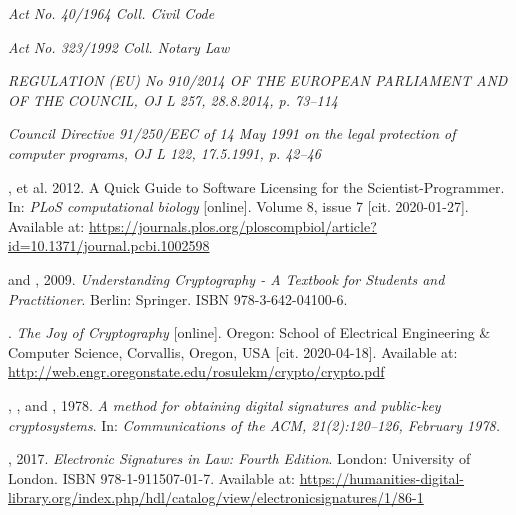 \documentclass[thesismargins, english, thesislinespacing, twoside, openright, upjsfrontpage]{rnthesis}
\begin{document}
\begin{thebibliography}{9}

  \emph{Act No. 40/1964 Coll. Civil Code}

  \emph{Act No. 323/1992 Coll. Notary Law}

  \emph{REGULATION (EU) No 910/2014 OF THE EUROPEAN PARLIAMENT AND OF THE COUNCIL, OJ L 257, 28.8.2014, p. 73–114}

  \emph{Council Directive 91/250/EEC of 14 May 1991 on the legal protection of computer programs, OJ L 122, 17.5.1991, p. 42–46}

  , et al. 2012. A Quick Guide to Software Licensing for the Scientist-Programmer. In: \emph{PLoS computational biology} [online]. Volume 8, issue 7 [cit. 2020-01-27]. Available at: \url{https://journals.plos.org/ploscompbiol/article?id=10.1371/journal.pcbi.1002598}

   and , 2009. \emph{Understanding Cryptography - A Textbook for Students and Practitioner}. Berlin: Springer. ISBN 978-3-642-04100-6.

  . \emph{The Joy of Cryptography} [online]. Oregon: School of Electrical Engineering \& Computer Science, Corvallis, Oregon, USA [cit. 2020-04-18]. Available at: \url{http://web.engr.oregonstate.edu/rosulekm/crypto/crypto.pdf}

  , , and , 1978. \emph{A method for obtaining digital signatures and public-key cryptosystems}. In: \emph{Communications of the ACM, 21(2):120–126, February 1978.}

  , 2017. \emph{Electronic Signatures in Law: Fourth Edition}. London: University of London. ISBN 978-1-911507-01-7. Available at: \url{https://humanities-digital-library.org/index.php/hdl/catalog/view/electronicsignatures/1/86-1}


\end{thebibliography}
\end{document}
